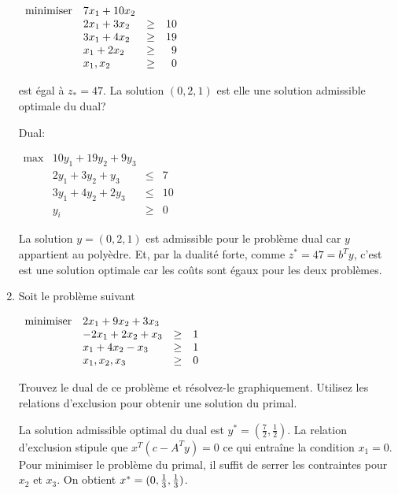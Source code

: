 \begin{enumerate}
    $
    \begin{array}{llcr}
      \mbox{minimiser} & 7x_1+10x_2\\
      & 2x_1+3x_2 & \geq & 10\\
      & 3x_1+4x_2 & \geq & 19\\
      & x_1+2x_2 & \geq & 9\\
      & x_1, x_2 & \geq & 0
    \end{array}
    $

    est égal à $z_*=47$. La solution $(0, 2, 1)$ est elle une solution admissible optimale du dual?


    \begin{solution}
      Dual:

      $
      \begin{array}{llcr}
        \max & 10y_{1} + 19y_{2} + 9y_{3}\\
        & 2y_{1} + 3y_{2} + y_{3} & \leq & 7\\
        & 3y_{1} + 4y_{2} + 2y_{3} & \leq & 10\\
        & y_{i} & \geq & 0
      \end{array}
      $

      La solution $y = (0,2,1)$ est admissible pour le problème dual car
      $y$ appartient au polyèdre.
      Et, par la dualité forte,
      comme $z^{*} = 47 = b^Ty$,
      c'est est une solution optimale
      car les coûts sont égaux pour les deux problèmes.
    \end{solution}

  \item Soit le problème suivant

    $
    \begin{array}{llcr}
      \mbox{minimiser} & 2x_1+9x_2+3x_3\\
      & -2x_1+2x_2 +x_3 & \geq & 1\\
      & x_1+4x_2 -x_3 & \geq & 1\\
      & x_1, x_2, x_3 & \geq & 0
    \end{array}
    $

    Trouvez le dual de ce problème et résolvez-le graphiquement. Utilisez les relations d'exclusion pour obtenir une solution du primal.

    \begin{solution}
      La solution admissible optimal du dual est
      $y^{*} = (\frac{7}{2}, \frac{1}{2})$.
      La relation d'exclusion stipule que $x^{T}(c-A^{T}y) = 0$
      ce qui entraîne la condition $x_{1} = 0$.
      Pour minimiser le problème du primal,
      il suffit de serrer les contraintes pour $x_{2}$ et $x_{3}$.
      On obtient $x^* = (0, \frac{1}{3}, \frac{1}{3})$.
    \end{solution}


\end{enumerate}
